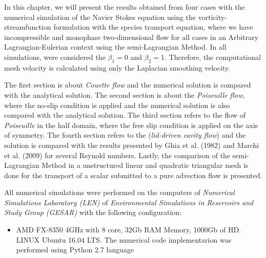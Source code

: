 In this chapter, we will present the results obtained from 
four cases with the numerical simulation of the Navier Stokes 
equation using the vorticity-streamfunction formulation with 
the species transport equation, where we have incompressible 
and monophase two-dimensional flow for all cases
in an Arbitrary Lagrangian-Eulerian context
using the semi-Lagrangian Method. 
In all simulations, were considered the $\beta_{1}=0$ 
and $\beta_{2}=1$. 
Therefore, the computational mesh velocity is
calculated using only the Laplacian smoothing velocity.

\medskip
The first section is about \textit{Couette flow} and 
the numerical solution is compared with the analytical solution. 
The second section is about the \textit{Poiseuille flow},
where the no-slip condition is applied 
and the numerical solution is also compared with 
the analytical solution. The third section refers to the flow 
of \textit {Poiseuille} in the half domain, where the 
free slip condition is applied on the axis of symmetry. 
The fourth section refers to the (\textit{lid-driven cavity flow}) 
and the solution is compared with the results presented 
by Ghia et al. (1982) \cite{ghia1982} and 
Marchi et al. (2009) \cite{marchi2009} for several Reynold numbers. 
Lastly, the comparison of the semi-Lagrangian Method in a unstructured
linear and quadratic triangular mesh is done
for the transport of a scalar 
submitted to a pure advection flow is presented.

\medskip
All numerical simulations were performed on the computers 
of \textit {Numerical Simulations Laboratory (LEN)} 
of \textit {Environmental Simulations in Reservoirs and 
Study Group (GESAR)} with the following configuration:

\begin{itemize}
 \item AMD FX-8350 4GHz with 8 core, 32Gb RAM Memory, 1000Gb of HD.
       LINUX Ubuntu 16.04 LTS. The numerical code implementarion was
       performed using Python 2.7 language
\end{itemize}

\newpage
